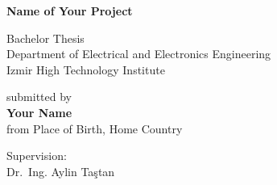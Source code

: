 \thispagestyle{empty}



\newcommand{\thesistitle}{Name of Your Project}
\newcommand{\thesisauthor}{Your Name}
\newcommand{\thesisauthororigin}{Place of Birth, Home Country}
\newcommand{\supervisor}{Dr.~Ing. Aylin Taştan}


\vfill
\begin{titlepage}  

\begin{center}
\LARGE
{\bf \thesistitle } \\
\large
\vspace*{4cm}
 
Bachelor Thesis  \\
Department of Electrical and Electronics Engineering\\Izmir High Technology Institute

 \vfill
 \vfill
 \vfill

submitted by   \\ \vspace*{0.2cm} 
{\bf \thesisauthor} \\ \vspace*{0.2cm} 
from \thesisauthororigin

 \vfill
 \vfill
 \vfill
 \vfill
 \vfill
 \vfill
 \vfill

Supervision:\\[5pt]
\supervisor\\

\end{center}


\end{titlepage}
